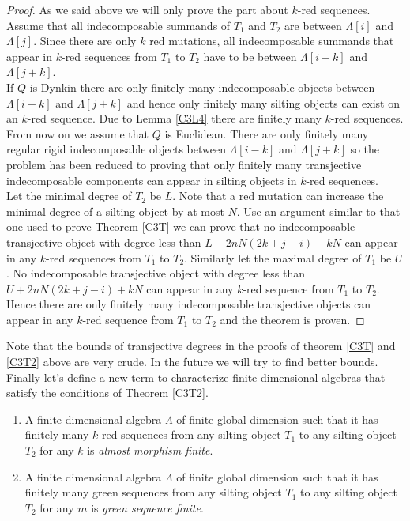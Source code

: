 \begin{proof}
\indent As we said above we will only prove the part about $k$-red sequences. Assume that all indecomposable summands of $T_1$ and $T_2$ are between $\Lambda[i]$ and $\Lambda[j]$. Since there are only $k$ red mutations, all indecomposable summands that appear in $k$-red sequences from $T_1$ to $T_2$ have to be between $\Lambda[i-k]$ and $\Lambda[j+k]$.\\ 
\indent If $Q$ is Dynkin there are only finitely many indecomposable objects between $\Lambda[i-k]$ and $\Lambda[j+k]$ and hence only finitely many silting objects can exist on an $k$-red sequence. Due to Lemma \ref{C3L4} there are finitely many $k$-red sequences. \\
\indent From now on we assume that $Q$ is Euclidean. There are only finitely many regular rigid indecomposable objects between $\Lambda[i-k]$ and $\Lambda[j+k]$ so the problem has been reduced to proving that only finitely many transjective indecomposable components can appear in silting objects in $k$-red sequences.\\
\indent Let the minimal degree of $T_2$ be $L$. Note that a red mutation can increase the minimal degree of a silting object by at most $N$. Use an argument similar to that one used to prove Theorem \ref{C3T} we can prove that no indecomposable transjective object with degree less than $L-2nN(2k+j-i)-kN$ can appear in any $k$-red sequences from $T_1$ to $T_2$. Similarly let the maximal degree of $T_1$ be $U$. No indecomposable transjective object with degree less than $U+2nN(2k+j-i)+kN$ can appear in any $k$-red sequence from $T_1$ to $T_2$. Hence there are only finitely many indecomposable transjective objects can appear in any $k$-red sequence from $T_1$ to $T_2$ and the theorem is proven.
\end{proof}
\indent Note that the bounds of transjective degrees in the proofs of theorem \ref{C3T} and \ref{C3T2} above are very crude. In the future we will try to find better bounds.\\
\indent Finally let's define a new term to characterize finite dimensional algebras that satisfy the conditions of Theorem \ref{C3T2}.\\
\begin{definition}
\begin{enumerate}
\item A finite dimensional algebra $\Lambda$ of finite global dimension such that it has finitely many $k$-red sequences from any silting object $T_1$ to any silting object $T_2$ for any $k$ is \textit{almost morphism finite}.
\item A finite dimensional algebra $\Lambda$ of finite global dimension such that it has finitely many green sequences from any silting object $T_1$ to any silting object $T_2$ for any $m$ is \textit{green sequence finite}.
\end{enumerate}
\end{definition}
